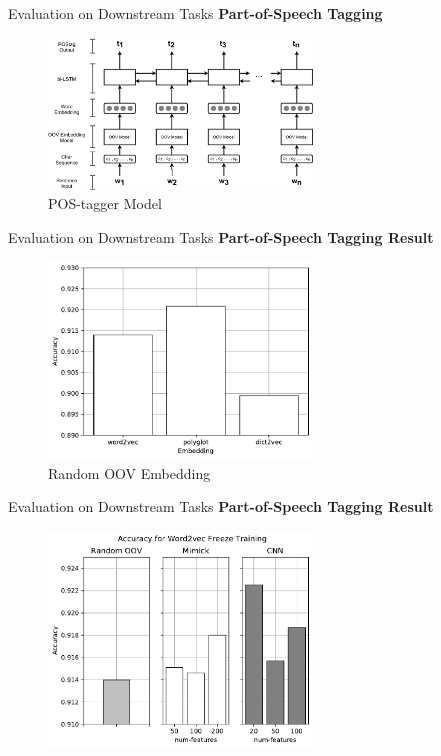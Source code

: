 \documentclass{beamer}
\begin{document}
\begin{frame}{Evaluation on Downstream Tasks}
    \textbf{Part-of-Speech Tagging}
    \begin{figure}[H]
        \centering
        \includegraphics[width=70mm]{images/postag}
        \caption{POS-tagger Model}
    \end{figure}
\end{frame}
\begin{frame}{Evaluation on Downstream Tasks}
    \textbf{Part-of-Speech Tagging Result}
    \begin{figure}[H]
        \centering
        \includegraphics[width=70mm]{images/random_graph}
        \caption{Random OOV Embedding}
    \end{figure}
\end{frame}
\begin{frame}{Evaluation on Downstream Tasks}
    \textbf{Part-of-Speech Tagging Result}
    \begin{figure}[H]
        \centering
        \includegraphics[width=70mm]{images/freeze_word2vec}
    \end{figure}
\end{frame}
\end{document}
